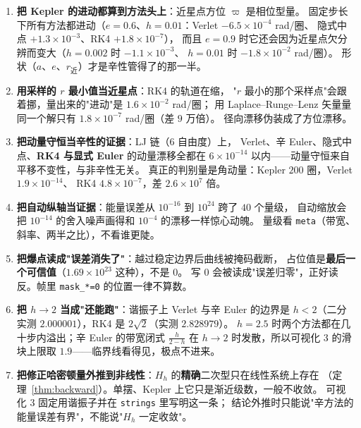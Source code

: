 \begin{enumerate}
  \item \textbf{把 Kepler 的进动都算到方法头上}：近星点方位 $\varpi$ 是相位型量。
        固定步长下所有方法都进动（$e=0.6$、$h=0.01$：Verlet $-6.5\times10^{-4}$ rad/圈、
        隐式中点 $+1.3\times10^{-3}$、RK4 $+1.8\times10^{-7}$），
        而且 $e=0.9$ 时它还会因为近星点欠分辨而变大（$h=0.002$ 时 $-1.1\times10^{-3}$、
        $h=0.01$ 时 $-1.8\times10^{-2}$ rad/圈）。
        形状（$a$、$e$、$r_{\text{近}}$）才是辛性管得了的那一半。
  \item \textbf{用采样的 $r$ 最小值当近星点}：RK4 的轨道在缩，
        "$r$ 最小的那个采样点"会跟着挪，量出来的"进动"是 $1.6\times10^{-2}$ rad/圈；
        用 Laplace--Runge--Lenz 矢量量同一个解只有 $1.8\times10^{-7}$ rad/圈（差 $9$ 万倍）。
        径向漂移伪装成了方位漂移。
  \item \textbf{把动量守恒当辛性的证据}：LJ 链（$6$ 自由度）上，
        Verlet、辛 Euler、隐式中点、\textbf{RK4 与显式 Euler} 的动量漂移全都在
        $6\times10^{-14}$ 以内——动量守恒来自平移不变性，与非辛性无关。
        真正的判别量是角动量：Kepler $200$ 圈，Verlet $1.9\times10^{-14}$、
        RK4 $4.8\times10^{-7}$，差 $2.6\times10^{7}$ 倍。
  \item \textbf{把自动纵轴当证据}：能量误差从 $10^{-16}$ 到 $10^{24}$ 跨了 $40$ 个量级，
        自动缩放会把 $10^{-14}$ 的舍入噪声画得和 $10^{-4}$ 的漂移一样惊心动魄。
        量级看 \texttt{meta}（带宽、斜率、两半之比），不看谁更陡。
  \item \textbf{把爆点读成"误差消失了"}：越过稳定边界后曲线被掩码截断，
        占位值是\textbf{最后一个可信值}（$1.69\times10^{23}$ 这种），不是 $0$。
        写 $0$ 会被读成"误差归零"，正好读反。帧里 \texttt{mask\_*=0} 的位置一律不算数。
  \item \textbf{把 $h\!\to\!2$ 当成"还能跑"}：谐振子上 Verlet 与辛 Euler 的边界是
        $h<2$（二分实测 $2.000001$），RK4 是 $2\sqrt2$（实测 $2.828979$）。
        $h=2.5$ 时两个方法都在几十步内溢出；辛 Euler 的带宽闭式 $\tfrac{h}{2-h}$
        在 $h\to2$ 时发散，所以可视化 3 的滑块上限取 $1.9$——临界线看得见，极点不进来。
  \item \textbf{把修正哈密顿量外推到非线性}：$H_h$ 的\textbf{精确}二次型只在线性系统上存在
        （定理~\ref{thm:backward}）。单摆、Kepler 上它只是渐近级数，一般不收敛。
        可视化 3 固定用谐振子并在 \texttt{strings} 里写明这一条；
        结论外推时只能说"辛方法的能量误差有界"，不能说"$H_h$ 一定收敛"。
\end{enumerate}
